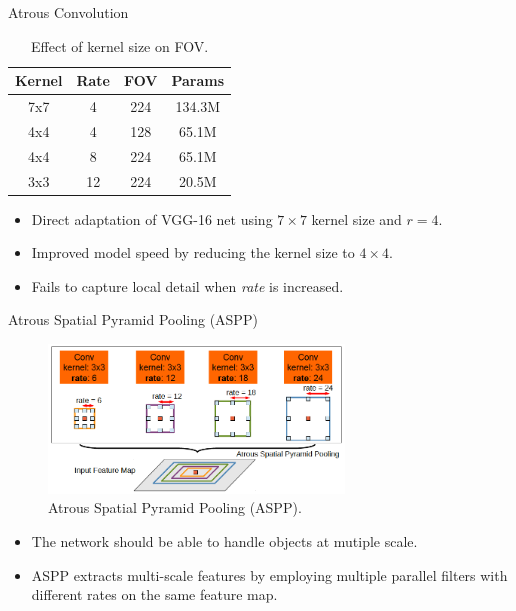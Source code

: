 \documentclass{beamer}
\newcommand\con{\item[$-$]}
\begin{document}
\begin{frame}{Atrous Convolution}
\begin{table}
	\setlength{\tabcolsep}{3pt}
	\begin{tabular}{ c c c | c }
		\hline
		\rule{0pt}{2.5ex}    
		Kernel & Rate & FOV  & \textbf{Params} \\
		\hline
		7x7 & 4 & 224 & 134.3M\\
		4x4 & 4 & 128 & 65.1M\\	
		4x4 & 8 & 224 & 65.1M\\
		3x3 & 12 & 224 & 20.5M\\	
		\hline					
\end{tabular}
\captionsetup{justification=centering}
\caption{Effect of kernel size on FOV.}	
\end{table}

\vspace{-0.4cm}
\begin{itemize}
	\item Direct adaptation of VGG-16 net using $7\times7$ kernel size and $r=4$.
	\item<2-> Improved model speed by reducing the kernel size to $4\times4$.
	\con<2-> Fails to capture local detail when \textit{rate} is increased.
\end{itemize}	
\end{frame}

\begin{frame}{Atrous Spatial Pyramid Pooling (ASPP)}
\begin{figure}
	\centering
	\includegraphics[width=0.7\textwidth]{figure/ss24.png}
	\captionsetup{justification=centering}
	\caption{Atrous Spatial Pyramid Pooling (ASPP).}	
\end{figure}
\vspace{-0.4cm}
\begin{itemize}
    \item The network should be able to handle objects at mutiple scale.
	\item ASPP extracts multi-scale features by employing multiple parallel filters with different rates on the same feature map.
\end{itemize}	
\end{frame}
\end{document}
